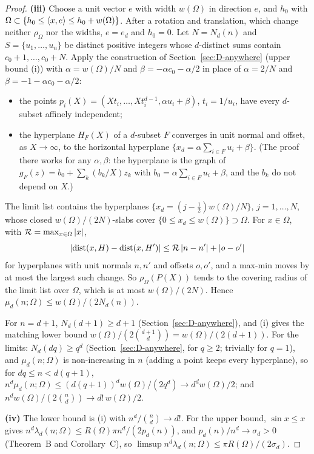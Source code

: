 \begin{proof}
\textbf{(iii)} Choose a unit vector $e$ with width $w(\Omega)$ in direction $e$, and $h_0$ with
$\Omega\subset\{h_0\le\langle x,e\rangle\le h_0+w(\Omega)\}$. After a rotation and translation, which change neither $\rho_\Omega$
nor the widths, $e=e_d$ and $h_0=0$. Let $N=N_d(n)$ and $S=\{u_1,\dots,u_n\}$ be distinct positive
integers whose $d$-distinct sums contain $c_0+1,\dots,c_0+N$. Apply the construction of
Section~\ref{sec:D-anywhere} (upper bound (i)) with $\alpha=w(\Omega)/N$ and $\beta=-\alpha c_0-\alpha/2$ in
place of $\alpha=2/N$ and $\beta=-1-\alpha c_0-\alpha/2$:
\begin{itemize}
  \item the points $p_i(X)=(Xt_i,\dots,Xt_i^{d-1},\alpha u_i+\beta)$, $t_i=1/u_i$, have every $d$-subset
    affinely independent;
  \item the hyperplane $H_F(X)$ of a $d$-subset $F$ converges in unit normal and offset, as $X\to\infty$,
    to the horizontal hyperplane $\{x_d=\alpha\sum_{i\in F}u_i+\beta\}$. (The proof there works for any
    $\alpha,\beta$: the hyperplane is the graph of $g_F(z)=b_0+\sum_k(b_k/X)z_k$ with
    $b_0=\alpha\sum_{i\in F}u_i+\beta$, and the $b_k$ do not depend on $X$.)
\end{itemize}
The limit list contains the hyperplanes $\{x_d=(j-\frac12)w(\Omega)/N\}$, $j=1,\dots,N$, whose closed
$w(\Omega)/(2N)$-slabs cover $\{0\le x_d\le w(\Omega)\}\supset \Omega$. For $x\in \Omega$, with
$\mathcal R=\max_{x\in \Omega}\left|x\right|$,
\[
  \left|\operatorname{dist}(x,H)-\operatorname{dist}(x,H')\right|\le\mathcal R\left|n-n'\right|+\left|o-o'\right|
\]
for hyperplanes with unit normals $n,n'$ and offsets $o,o'$, and a max-min moves by at most the largest such
change. So $\rho_\Omega(P(X))$ tends to the covering radius of the limit list over $\Omega$, which is at most
$w(\Omega)/(2N)$. Hence $\mu_d(n;\Omega)\le w(\Omega)/(2N_d(n))$.

For $n=d+1$, $N_d(d+1)\ge d+1$ (Section~\ref{sec:D-anywhere}), and (i) gives the matching lower bound
$w(\Omega)/(2\binom{d+1}d)=w(\Omega)/(2(d+1))$. For the limits: $N_d(dq)\ge q^d$ (Section~\ref{sec:D-anywhere},
for $q\ge2$; trivially for $q=1$), and $\mu_d(n;\Omega)$ is non-increasing in $n$ (adding a point keeps every
hyperplane), so for $dq\le n<d(q+1)$, $n^d\mu_d(n;\Omega)\le(d(q+1))^dw(\Omega)/(2q^d)\to d^dw(\Omega)/2$; and
$n^dw(\Omega)/(2\binom nd)\to d!\,w(\Omega)/2$.

\textbf{(iv)} The lower bound is (i) with $n^d/\binom nd\to d!$. For the upper bound, $\sin x\le x$
gives $n^d\lambda_d(n;\Omega)\le R(\Omega)\pi n^d/(2p_d(n))$, and $p_d(n)/n^d\to\sigma_d>0$ (Theorem~B and
Corollary~C), so $\limsup n^d\lambda_d(n;\Omega)\le\pi R(\Omega)/(2\sigma_d)$.
\end{proof}

